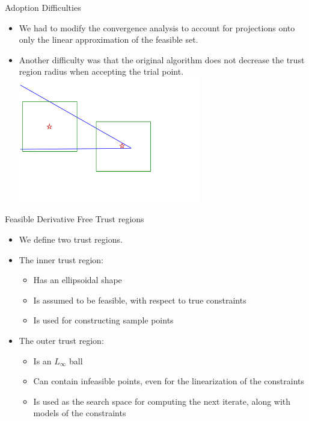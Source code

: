 \documentclass{beamer}
\begin{document}
\begin{frame}{Adoption Difficulties}

\begin{itemize}
    \item We had to modify the convergence analysis to account for projections onto only the linear approximation of the feasible set.
    \item Another difficulty was that the original algorithm does not decrease the trust region radius when accepting the trial point.
    \includegraphics[width=300px]{images/decrease_required.png}
\end{itemize}


\end{frame}


\begin{frame}{Feasible Derivative Free Trust regions}
    \begin{itemize}
        \item We define two trust regions.
        \item The inner trust region:
            \begin{itemize}
                \item Has an ellipsoidal shape
                \item Is assumed to be feasible, with respect to true constraints
                \item Is used for constructing sample points
            \end{itemize}
        \item The outer trust region:
            \begin{itemize}
                \item Is an $L_{\infty}$ ball
                \item Can contain infeasible points, even for the linearization of the constraints
                \item Is used as the search space for computing the next iterate, along with models of the constraints
            \end{itemize}
    \end{itemize}
\end{frame}
\end{document}
